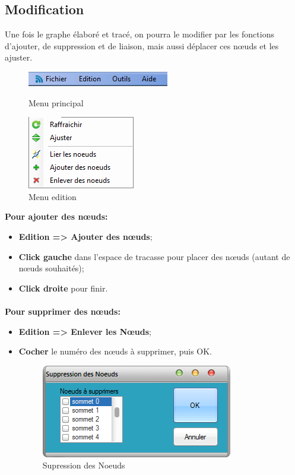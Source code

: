 \documentclass[11pt,twoside,a4paper]{article}
\begin{document}
\subsection{Modification}
Une fois le graphe élaboré et tracé, on pourra le modifier par les fonctions d’ajouter, de suppression et de liaison, mais aussi déplacer ces nœuds et les ajuster.
\begin{figure}[!h]
\begin{center}
\includegraphics{menu.png}
\caption{Menu principal}
\includegraphics{edition.png}
\caption{Menu  edition}
\end{center}
\end{figure}

{\bf Pour  ajouter des nœuds:}
\begin{itemize}
	\item \textbf{Edition => Ajouter des nœuds}; 
	\item \textbf{Click gauche} dans l’espace de tracasse pour placer des nœuds (autant de nœuds souhaités);
	\item \textbf{Click droite} pour finir.
\end{itemize}
\paragraph{}
{\bf Pour supprimer des nœuds:}
\begin{itemize}
	\item \textbf{Edition => Enlever les Nœuds};
	\item \textbf{Cocher} le numéro des nœuds à supprimer, puis OK.
\begin{figure}[!h]
\begin{center}
\includegraphics{supprimer.png}
\caption{Supression des Noeuds}
\end{center}
\end{figure}
\end{itemize}
\end{document}
